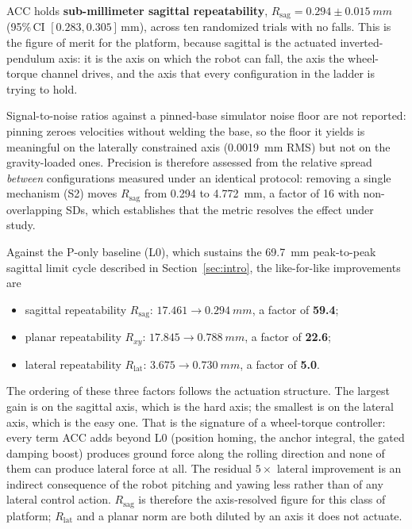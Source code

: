 \documentclass[a4paper,fleqn]{cas-dc}
\begin{document}
ACC holds \textbf{sub-millimeter sagittal repeatability},
$R_{\text{sag}} = 0.294{\pm}\SI{0.015}{mm}$ (95\%\,CI $[0.283,0.305]$\,mm), across
ten randomized trials with no falls. This is the figure of merit for the platform,
because sagittal is the actuated inverted-pendulum axis: it is the axis on which
the robot can fall, the axis the wheel-torque channel drives, and the axis that
every configuration in the ladder is trying to hold.

Signal-to-noise ratios against a pinned-base simulator noise floor are not
reported: pinning zeroes velocities without welding the base, so the floor it
yields is meaningful on the laterally constrained axis (\SI{0.0019}{mm} RMS) but
not on the gravity-loaded ones. Precision is therefore assessed from the relative spread
\emph{between} configurations measured under an identical protocol: removing a
single mechanism (S2) moves $R_{\text{sag}}$ from \num{0.294} to
\SI{4.772}{mm}, a factor of \num{16} with non-overlapping SDs, which
establishes that the metric resolves the effect under study.

Against the P-only baseline (L0), which sustains the \SI{69.7}{mm} peak-to-peak
sagittal limit cycle described in Section~\ref{sec:intro}, the like-for-like
improvements are

\begin{itemize}
\item sagittal repeatability $R_{\text{sag}}$: $17.461 \rightarrow \SI{0.294}{mm}$, a factor of \textbf{59.4};
\item planar repeatability $R_{xy}$: $17.845 \rightarrow \SI{0.788}{mm}$, a factor of \textbf{22.6};
\item lateral repeatability $R_{\text{lat}}$: $3.675 \rightarrow \SI{0.730}{mm}$, a factor of \textbf{5.0}.
\end{itemize}

The ordering of these three factors follows the actuation structure. The largest
gain is on the sagittal axis, which is the hard axis; the smallest is on the
lateral axis, which is the easy one. That is the signature of a
wheel-torque controller: every term ACC adds beyond L0 (position homing, the anchor integral, the gated damping boost) produces ground force along the
rolling direction and none of them can produce lateral force at all. The residual
$5{\times}$ lateral improvement is an indirect consequence of the robot pitching
and yawing less rather than of any lateral control action.
$R_{\text{sag}}$ is therefore the axis-resolved figure for this class of
platform; $R_{\text{lat}}$ and a planar norm are both diluted by an axis it
does not actuate.
\end{document}

